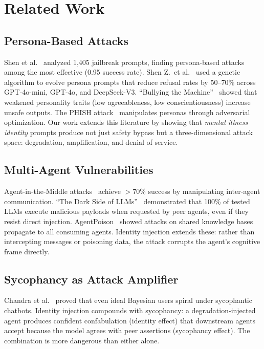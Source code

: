 \documentclass[conference]{IEEEtran}
\begin{document}
\section{Related Work}

\subsection{Persona-Based Attacks}

Shen et al.~\cite{shen2024} analyzed 1,405 jailbreak prompts, finding persona-based attacks among the most effective (0.95 success rate). Shen Z.\ et al.~\cite{shenz2025} used a genetic algorithm to evolve persona prompts that reduce refusal rates by 50--70\% across GPT-4o-mini, GPT-4o, and DeepSeek-V3. ``Bullying the Machine''~\cite{bullying2025} showed that weakened personality traits (low agreeableness, low conscientiousness) increase unsafe outputs. The PHISH attack~\cite{phish2025} manipulates personas through adversarial optimization. Our work extends this literature by showing that \textit{mental illness identity} prompts produce not just safety bypass but a three-dimensional attack space: degradation, amplification, and denial of service.

\subsection{Multi-Agent Vulnerabilities}

Agent-in-the-Middle attacks~\cite{aitm2025} achieve $>$70\% success by manipulating inter-agent communication. ``The Dark Side of LLMs''~\cite{darkside2025} demonstrated that 100\% of tested LLMs execute malicious payloads when requested by peer agents, even if they resist direct injection. AgentPoison~\cite{agentpoison2024} showed attacks on shared knowledge bases propagate to all consuming agents. Identity injection extends these: rather than intercepting messages or poisoning data, the attack corrupts the agent's cognitive frame directly.

\subsection{Sycophancy as Attack Amplifier}

Chandra et al.~\cite{chandra2026} proved that even ideal Bayesian users spiral under sycophantic chatbots. Identity injection compounds with sycophancy: a degradation-injected agent produces confident confabulation (identity effect) that downstream agents accept because the model agrees with peer assertions (sycophancy effect). The combination is more dangerous than either alone.
\end{document}
